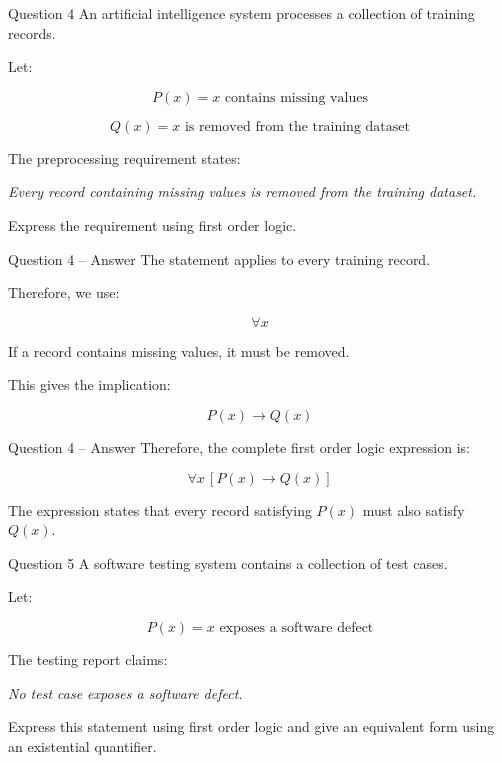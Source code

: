 
\begin{frame}{Question 4}
An artificial intelligence system processes a collection of training
records.

Let:

$$
P(x) = \text{$x$ contains missing values}
$$

$$
Q(x) = \text{$x$ is removed from the training dataset}
$$

The preprocessing requirement states:

\begin{center}
\textit{Every record containing missing values is removed from the
training dataset.}
\end{center}

Express the requirement using first order logic.
\end{frame}

\begin{frame}{Question 4 -- Answer}
The statement applies to every training record.

Therefore, we use:

$$
\forall x
$$

If a record contains missing values, it must be removed.

This gives the implication:

$$
P(x)\rightarrow Q(x)
$$

\end{frame}

\begin{frame}{Question 4 -- Answer}
Therefore, the complete first order logic expression is:

$$
\boxed{\forall x\,[P(x)\rightarrow Q(x)]}
$$

The expression states that every record satisfying $P(x)$ must also
satisfy $Q(x)$.
\end{frame}


\begin{frame}{Question 5}
A software testing system contains a collection of test cases.

Let:

$$
P(x) = \text{$x$ exposes a software defect}
$$

The testing report claims:

\begin{center}
\textit{No test case exposes a software defect.}
\end{center}

Express this statement using first order logic and give an equivalent
form using an existential quantifier.
\end{frame}

